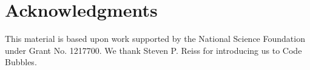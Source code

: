 \documentclass[conference]{IEEEtran}
\begin{document}

%




\section*{Acknowledgments}

This material is based upon work supported by the National Science Foundation under Grant No. 1217700. 
%
We thank Steven P. Reiss for introducing us to Code Bubbles.










\end{document}
